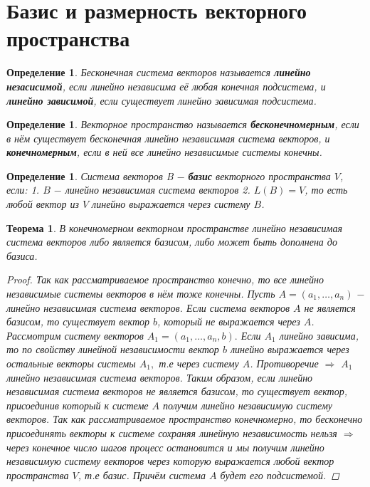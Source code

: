 \documentclass[../../main.tex]{subfiles}
\begin{document}
\section{Базис и размерность векторного пространства}


\newtheorem*{Definition1}{Определение}
\begin{Definition1}
Бесконечная система векторов называется \textbf{линейно незасисимой}, если линейно независима её любая конечная подсистема, и \textbf{линейно зависимой}, если существует линейно зависимая подсистема.
\end{Definition1}


\newtheorem*{Definition2}{Определение}
\begin{Definition2}
Векторное пространство называется \textbf{бесконечномерным}, если в нём существует бесконечная линейно независимая система векторов, и \textbf{конечномерным}, если в ней все линейно независимые системы конечны.
\end{Definition2}


\newtheorem*{Definition3}{Определение}
\begin{Definition3}
\obeylines
Система векторов B $-$ \textbf{базис} векторного пространства $V$, если:
\hfill
1. $B$ $- $ линейно независимая система векторов
2. $L(B) = V$,  то есть любой вектор из $V$ линейно выражается через  систему $B$.
\end{Definition3}


\newtheorem*{t1}{Теорема}
\begin{t1}
В конечномерном векторном пространстве линейно независимая система векторов 
либо является базисом, либо может быть дополнена до базиса.
\begin{proof}
Так как рассматриваемое пространство конечно, то все линейно независимые системы векторов в нём тоже конечны.
Пусть $A = (a_{1},\dots,a_{n})$ $-$ линейно независимая система векторов. Если система векторов $A$ не является базисом, то
существует вектор $b$, который не выражается через $A$. Рассмотрим систему векторов $A_{1} = (a_{1},\dots,a_{n},b).$ 
Если $A_{1}$ линейно зависима, то по свойству линейной независимости вектор $b$ линейно выражается через остальные векторы системы $A_{1},$
т.е через систему $A$. Противоречие $\Rightarrow$ $A_{1}$ линейно независимая система векторов. Таким образом, если линейно независимая система векторов 
не является базисом, то существует вектор, присоединив который к системе $A$ получим линейно независимую систему векторов. Так как рассматриваемое пространство
конечномерно, то бесконечно присоединять векторы к системе сохраняя линейную независимость нельзя $\Rightarrow$ через конечное число шагов процесс остановится 
и мы получим линейно независимую систему векторов через которую выражается любой вектор пространства $V$, т.е базис. Причём система $A$ будет его подсистемой.
\end{proof}
\end{t1}
\end{document}
